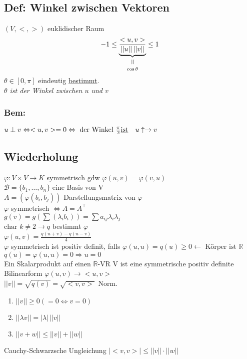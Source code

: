 \documentclass[titlepage,12pt,a4paper,ngerman]{report}
\newcommand{\verteq}{\rotatebox{90}{$\,=$}}
\newcommand{\equalto}[2]{\underset{\scriptstyle\overset{\mkern4mu\verteq}{#2}}{#1}}
\newcommand{\tx}[1]{\textrm{#1}}
\newcommand{\ub}[1]{\underbrace{#1}}
\begin{document}
\subsection{Def: Winkel zwischen Vektoren}
$ (V,<,>) $ euklidischer Raum
$$ -1 \le \equalto{\ub{ \frac{<u,v>}{||u||\, ||v||} }}{\cos \theta} \le 1$$
$ \theta \in [0,\pi] $ eindeutig \underline{bestimmt}.\\
\emph{$ \theta $ ist der Winkel zwischen $ u $ und $ v $}
\subsubsection*{Bem:}
$ u \perp v \Leftrightarrow <u,v> = 0 \Leftrightarrow \tx{ der Winkel } \frac{\pi}{2} \tx{\underline{ist}} \quad u \uparrow \rightarrow v$


\subsection{Wiederholung}
$ \varphi : V \times V \to K $
symmetrisch gdw $ \varphi(u,v) = \varphi(v,u) $\\
$ \mathcal{B}= \{b_1,\dots, b_n\} $ eine Basis von V \\
$A = (\varphi(b_i,b_j)) $ Darstellungsmatrix von $ \varphi $\\
$ \varphi $ symmetrisch $ \Leftrightarrow  A = A^\top$\\
$ g(v) = g(\sum(\lambda_i b_i)) =\sum a_{ij} \lambda_i \lambda_j $\\
$ \tx{char } k \neq 2 \rightarrow q $ bestimmt $ \varphi $\\
$ \varphi(u,v) = \frac{q(u+v) - q(u-v)}{4} $\\
$ \varphi $ symmetrisch ist positiv definit, falls $ \varphi(u,u) = q(u) \ge 0 \leftarrow \tx{ Körper ist } \mathbb{R} $\\
$ q(u) = \varphi(u,u)= 0 \Rightarrow u = 0 $\\
Ein Skalarprodukt auf einen $ \mathbb{R} $-VR V ist eine symmetrische positiv definite Bilinearform
$ \varphi(u,v) \to <u,v> $\\
$ ||v||=\sqrt{q(v)} = \sqrt{<v,v>}$ Norm. \\
\begin{enumerate}[1)]
	\item $ ||v||\ge 0 ( = 0 \Leftrightarrow v = 0) $
	\item $ ||\lambda v || = | \lambda|\, ||v|| $
	\item $ ||v+w|| \le ||v|| + ||w|| $
\end{enumerate}
Cauchy-Schwarzsche Ungleichung $ |<v,v>| \le ||v|| \cdot ||w|| $
\end{document}
